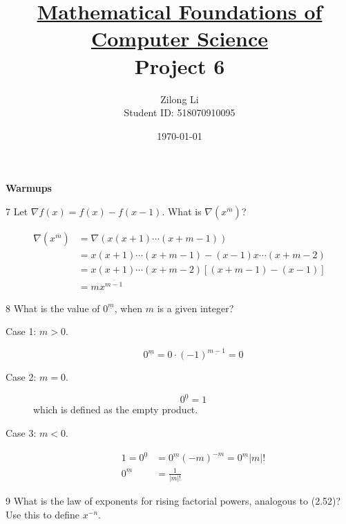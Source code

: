 \documentclass[a4paper,12pt]{article}
\title{\small \underline{Mathematical Foundations of Computer Science}\\\Large Project 6}
\author{Zilong Li\\\small Student ID: 518070910095}
\date{\today}
\makeatletter
\newtheorem*{solution}{Solution}
\theoremstyle{definition}
\renewenvironment{solution}[1][Solution] {\par\pushQED{\qed}\normalfont\topsep6\p@\@plus6\p@\relax\trivlist\item[\hskip\labelsep\bfseries#1\@addpunct{.}]\ignorespaces}{\popQED\endtrivlist\@endpefalse} \makeatother
\newenvironment{problems}{\begin{list}{}{\renewcommand{\makelabel}[1]{\textbf{##1}\hfil}}}{\end{list}}
\makeatother
\begin{document}
\maketitle

\noindent\textbf{Warmups}

\begin{problems}

    \item[7] Let $\nabla f(x)=f(x)-f(x-1)$. What is $\nabla (x^{\overline{m}})$?
    \begin{solution} 
    \begin{align*}
        \nabla (x^{\overline{m}}) &= \nabla (x(x+1)\cdots(x+m-1))\\
        &=x(x+1)\cdots(x+m-1) - (x-1)x\cdots(x+m-2)\\
        &=x(x+1)\cdots(x+m-2)\left[(x+m-1)-(x-1)\right]\\
        &=mx^{\overline{m-1}}
    \end{align*} 
    \end{solution}
    \item[8] What is the value of $0^{\underline{m}}$, when $m$ is a given integer?
    \begin{solution}
        \begin{description}
            \item[Case 1: $m>0$.]  \begin{equation*}
                0^{\underline{m}} = 0\cdot (-1)^{\underline{m-1}} = 0
            \end{equation*}
            \item[Case 2: $m=0$.] \begin{equation*}
                0^{\underline{0}} = 1
            \end{equation*}
            which is defined as the empty product.
            \item[Case 3: $m<0$.] \begin{align*}
                1 = 0^{\underline{0}} &= 0^{\underline{m}}(-m)^{\underline{-m}} = 0^{\underline{m}}|m|!\\
                0^{\underline{m}}&=\frac{1}{|m|!}
            \end{align*}
        \end{description}
    \end{solution} 
    \item[9] What  is  the  law  of  exponents  for  rising  factorial  powers,  analogous  to (2.52)? Use this to define $x^{\overline{-n}}$.
    \begin{solution}

\end{solution}
\end{problems}
\end{document}
